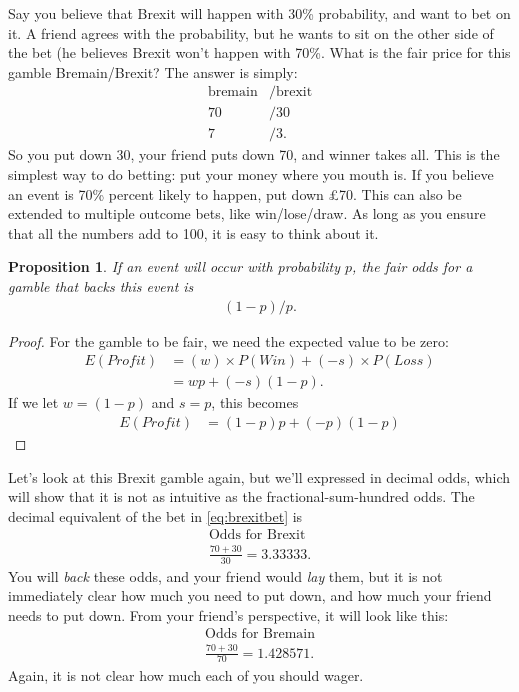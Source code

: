 \documentclass[a4paper]{article}
\newtheorem{proposition}{Proposition}
\begin{document}
Say you believe that Brexit will happen with 30\% probability, and want to bet on it.
A friend agrees with the probability, but he wants to sit on the other side of the bet (he believes Brexit won't happen with 70\%.
What is the fair price for this gamble Bremain/Brexit?
The answer is simply:
\begin{align}
 \text{bremain}&/\text{brexit} \label{eq:brexitbet} \\
 70&/30 \nonumber \\
 7&/3  \nonumber
 \text{.}
\end{align}
So you put down 30, your friend puts down 70, and winner takes all.
This is the simplest way to do betting: put your money where you mouth is.
If you believe an event is 70\% percent likely to happen, put down £70.
This can also be extended to multiple outcome bets, like win/lose/draw.
As long as you ensure that all the numbers add to 100, it is easy to think about it.

\begin{proposition}
If an event will occur with probability $p$, the fair odds for a gamble that backs this event is
\begin{align}
(1-p)/p
\text{.}
\end{align}
\end{proposition}
\begin{proof}
For the gamble to be fair, we need the expected value to be zero:
\begin{align*}
E(Profit)
&=
(w)    \times P(Win) +
(-s)   \times P(Loss)  \\
&=
wp +
(-s)(1-p)
\text{.}
\end{align*}
If we let $w=(1-p)$ and $s=p$, this becomes
\begin{align*}
E(Profit)
&=
(1-p)p +
(-p)(1-p)
\end{align*}
\end{proof}



Let's look at this Brexit gamble again, but we'll expressed in decimal odds, which will show that it is not as intuitive as the fractional-sum-hundred odds.
The decimal equivalent of the bet in \eqref{eq:brexitbet} is
\begin{align*}
 \text{Odds for Brexit} \\
 \frac{70 + 30}{30} = 3.33333 \text{.}
\end{align*}
You will \emph{back} these odds, and your friend would \emph{lay} them, but it is not immediately clear how much you need to put down, and how much your friend needs to put down.
From your friend's perspective, it will look like this:
\begin{align*}
 \text{Odds for Bremain} \\
 \frac{70 + 30}{70} =
 1.428571
 \text{.}
\end{align*}
Again, it is not clear how much each of you should wager.
\end{document}

